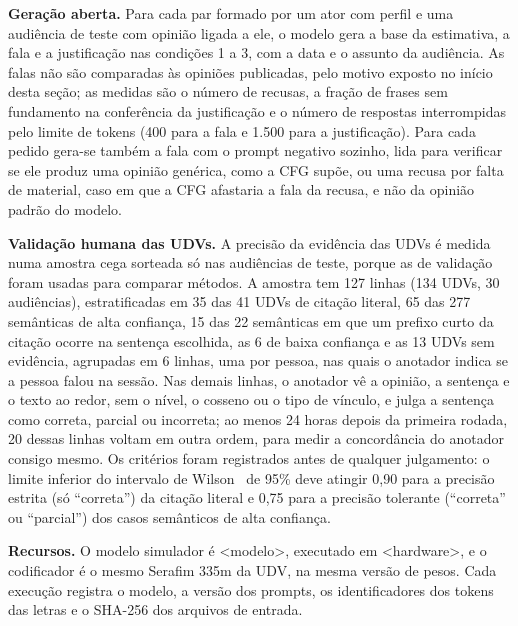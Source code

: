 \textbf{Geração aberta.} Para cada par formado por um ator com perfil e uma audiência de teste com
opinião ligada a ele, o modelo gera a base da estimativa, a fala e a justificação nas condições 1 a
3, com a data e o assunto da audiência. As falas não são comparadas às opiniões publicadas, pelo
motivo exposto no início desta seção; as medidas são o número de recusas, a fração de frases sem
fundamento na conferência da justificação e o número de respostas interrompidas pelo limite de
tokens (400 para a fala e 1.500 para a justificação). Para cada pedido gera-se também a fala com o
prompt negativo sozinho, lida para verificar se ele produz uma opinião genérica, como a CFG supõe, ou
uma recusa por falta de material, caso em que a CFG afastaria a fala da recusa, e não da opinião
padrão do modelo.

\textbf{Validação humana das UDVs.} A precisão da evidência das UDVs é medida numa amostra cega
sorteada só nas audiências de teste, porque as de validação foram usadas para comparar métodos. A
amostra tem 127 linhas (134 UDVs, 30 audiências), estratificadas em 35 das 41 UDVs de citação literal,
65 das 277 semânticas de alta confiança, 15 das 22 semânticas em que um prefixo curto da citação
ocorre na sentença escolhida, as 6 de baixa confiança e as 13 UDVs sem evidência, agrupadas em 6
linhas, uma por pessoa, nas quais o anotador indica se a pessoa falou na sessão. Nas demais linhas, o
anotador vê a opinião, a sentença e o texto ao redor, sem o nível, o cosseno ou o tipo de vínculo, e
julga a sentença como correta, parcial ou incorreta; ao menos 24 horas depois da primeira rodada, 20
dessas linhas voltam em outra ordem, para medir a concordância do anotador consigo mesmo. Os critérios foram registrados antes de qualquer julgamento: o limite inferior do intervalo
de Wilson~\citep{wilson1927probable} de 95\% deve atingir 0,90 para a precisão estrita (só
``correta'') da citação literal e 0,75 para a precisão tolerante (``correta'' ou ``parcial'') dos
casos semânticos de alta confiança.

\textbf{Recursos.} O modelo simulador é <modelo>, executado em <hardware>, e o codificador é o mesmo
Serafim 335m da UDV, na mesma versão de pesos. Cada execução registra o modelo, a versão dos prompts,
os identificadores dos tokens das letras e o SHA-256 dos arquivos de entrada.
